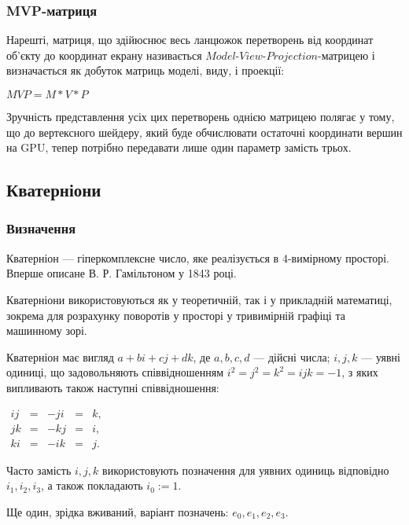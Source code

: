 \subsubsection{MVP-матриця}

Нарешті, матриця, що здійюснює весь ланцюжок перетворень від координат об'єкту до координат екрану називається $\textit{Model-View-Projection}$-матрицею і визначається як добуток матриць моделі, виду, і проекції:

\begin{center}
  $\mathit{MVP} = M*V*P$
\end{center}

Зручність представлення усіх цих перетворень однією матрицею полягає у тому, що до вертексного шейдеру, який буде обчислювати остаточні координати вершин на GPU, тепер потрібно передавати лише один параметр замість трьох.

\subsection{Кватерніони}

\subsubsection{Визначення}

Кватерніон  — гіперкомплексне число, яке реалізується в 4-вимірному просторі. Вперше описане В. Р. Гамільтоном у 1843 році.

Кватерніони використовуються як у теоретичній, так і у прикладній математиці, зокрема для розрахунку поворотів у просторі у тривимірній графіці та машинному зорі.

Кватерніон має вигляд $a + bi + cj + dk$, де $a, b, c, d$ — дійсні числа;
$i, j, k$ — уявні одиниці, що задовольняють співвідношенням
$i^2 = j^2 = k^2 = ijk = -1$, з яких випливають також наступні співвідношення: \\
\begin{center}
  $\begin{matrix}
    ij & = & -ji & = & k, \\
    jk & = & -kj & = & i, \\
    ki & = & -ik & = & j.
  \end{matrix}$
\end{center}

Часто замість $i, j, k$ використовують позначення для уявних одиниць відповідно $i_1, i_2, i_3$, а також покладають $i_0 := 1$.

Ще один, зрідка вживаний, варіант позначень: $e_0, e_1, e_2, e_3$.


